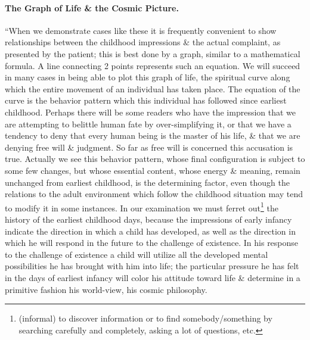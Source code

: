 \documentclass{article}
\begin{document}
\paragraph{The Graph of Life \& the Cosmic Picture.} ``When we demonstrate cases like these it is frequently convenient to show relationships between the childhood impressions \& the actual complaint, as presented by the patient; this is best done by a graph, similar to a mathematical formula. A line connecting 2 points represents such an equation. We will succeed in many cases in being able to plot this graph of life, the spiritual curve along which the entire movement of an individual has taken place. The equation of the curve is the behavior pattern which this individual has followed since earliest childhood. Perhaps there will be some readers who have the impression that we are attempting to belittle human fate by over-simplifying it, or that we have a tendency to deny that every human being is the master of his life, \& that we are denying free will \& judgment. So far as free will is concerned this accusation is true. Actually we see this behavior pattern, whose final configuration is subject to some few changes, but whose essential content, whose energy \& meaning, remain unchanged from earliest childhood, is the determining factor, even though the relations to the adult environment which follow the childhood situation may tend to modify it in some instances. In our examination we must ferret out\footnote{(informal) to discover information or to find somebody/something by searching carefully and completely, asking a lot of questions, etc.} the history of the earliest childhood days, because the impressions of early infancy indicate the direction in which a child has developed, as well as the direction in which he will respond in the future to the challenge of existence. In his response to the challenge of existence a child will utilize all the developed mental possibilities he has brought with him into life; the particular pressure he has felt in the days of earliest infancy will color his attitude toward life \& determine in a primitive fashion his world-view, his cosmic philosophy.
\end{document}

